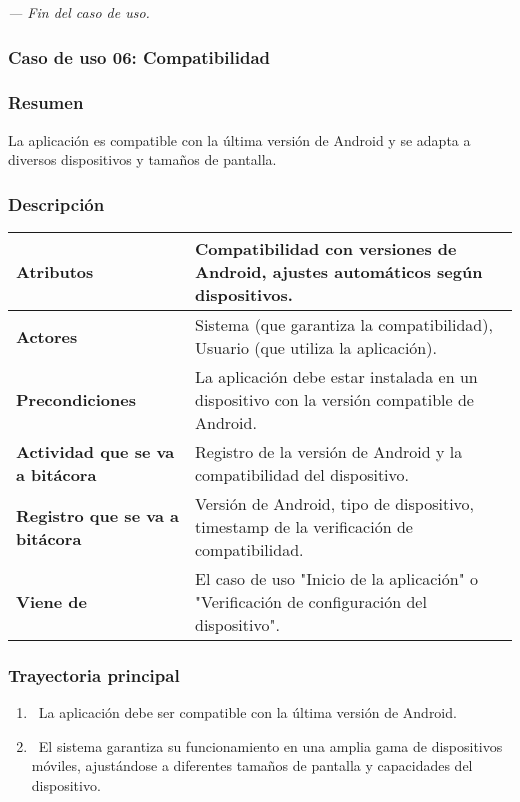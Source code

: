 \textit{--- Fin del caso de uso.}
\newpage
\subsubsection{Caso de uso 06: Compatibilidad}
\subsubsection{Resumen}
La aplicación es compatible con la última versión de Android y se adapta a diversos dispositivos y tamaños de pantalla.
\subsubsection{Descripción}
\begin{table}[h]
    \centering
    \begin{longtable}{|l|p{10cm}|}  %
    \hline
    \textbf{Atributos} & Compatibilidad con versiones de Android, ajustes automáticos según dispositivos. \\ \hline
    \textbf{Actores} & Sistema (que garantiza la compatibilidad), Usuario (que utiliza la aplicación). \\ \hline
    \textbf{Precondiciones} & La aplicación debe estar instalada en un dispositivo con la versión compatible de Android. \\ \hline
    \textbf{Actividad que se va a bitácora} & Registro de la versión de Android y la compatibilidad del dispositivo. \\ \hline
    \textbf{Registro que se va a bitácora} & Versión de Android, tipo de dispositivo, timestamp de la verificación de compatibilidad. \\ \hline
    \textbf{Viene de} & El caso de uso "Inicio de la aplicación" o "Verificación de configuración del dispositivo". \\ \hline
       
    \end{longtable}
\end{table}
    
\subsubsection{Trayectoria principal}
\begin{enumerate}[label=\textbf{\arabic*}, leftmargin=1.5cm]
    \item \UCsystem \ La aplicación debe ser compatible con la última versión de Android.
    
    \item \UCsystem \ El sistema garantiza su funcionamiento en una amplia gama de dispositivos móviles, ajustándose a diferentes tamaños de pantalla y capacidades del dispositivo.

\end{enumerate}

